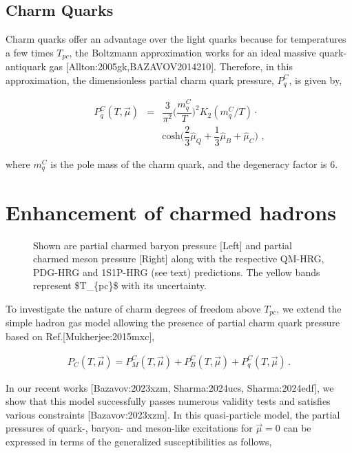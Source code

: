 \documentclass[11pt,a4paper]{article}
\begin{document}
\subsection{Charm Quarks}

Charm quarks offer an advantage over the light quarks because for temperatures a few times $T_{pc}$, the Boltzmann approximation works for an ideal massive quark-antiquark gas [Allton:2005gk,BAZAVOV2014210]. Therefore, in this approximation, the dimensionless partial charm quark pressure, $P^C_{q}$, is given by,

$$\begin{eqnarray}
	P^C_{q}(T,\overrightarrow{\mu})&=&\dfrac{3}{\pi^2}\bigg(\dfrac{m_q^C}{T}\bigg)^2K_2(m_q^C/T)\cdot \nonumber \\
	&&\text{cosh}\bigg(\dfrac{2}{3}\hat{\mu}_Q+\dfrac{1}{3}\hat{\mu}_B+\hat{\mu}_C\bigg) \text { ,}
	
\end{eqnarray}$$

where $m_q^C$ is the pole mass of the charm quark, and the degeneracy factor is 6.

\section{Enhancement of charmed hadrons}

\begin{figure}[h]
\caption{Shown are partial charmed baryon pressure [Left] and partial charmed meson pressure [Right] along with the respective QM-HRG, PDG-HRG and 1S1P-HRG (see text) predictions. The yellow bands represent \$T\_\{pc\}\$ with its uncertainty.}
\end{figure}

\begin{figure}[h]
\end{figure}

To investigate the nature of charm degrees of freedom above  $T_{pc}$, we extend the simple hadron gas model allowing the presence of partial charm quark pressure based on Ref.[Mukherjee:2015mxc],

$$\begin{align}
	P_C(T,\vec{\mu})=P^C_{M}(T,\vec{\mu})+P^C_{B}(T,\vec{\mu})+P^C_{q}(T,\vec{\mu}) \, .
	
\end{align}$$

In our recent works [Bazavov:2023xzm, Sharma:2024ucs, Sharma:2024edf], we show that this model successfully passes numerous validity tests and satisfies various constraints [Bazavov:2023xzm]. In this quasi-particle model, the partial pressures of quark-, baryon- and meson-like excitations for $\vec{\mu}=0$ can be expressed in terms of the generalized susceptibilities as follows,
\end{document}
